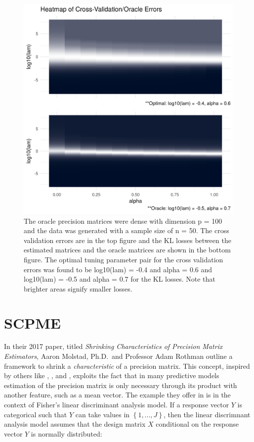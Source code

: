 \documentclass[11pt,]{report}
\theoremstyle{definition}
\theoremstyle{definition}
\theoremstyle{definition}
\theoremstyle{remark}
\begin{document}
\begin{figure}

{\centering \includegraphics[width=0.85\linewidth,]{images/repsKLdenseQR_N50_P100} 

}

\caption{The oracle precision matrices were dense with dimension p = 100 and the data was generated with a sample size of n = 50. The cross validation errors are in the top figure and the KL losses between the estimated matrices and the oracle matrices are shown in the bottom figure. The optimal tuning parameter pair for the cross validation errors was found to be log10(lam) = -0.4 and alpha = 0.6 and log10(lam) = -0.5 and alpha = 0.7 for the KL losses. Note that brighter areas signify smaller losses.}\label{fig:admmsim3}
\end{figure}

\hypertarget{scpme}{%
\chapter{SCPME}\label{scpme}}

In their 2017 paper, titled \emph{Shrinking Characteristics of Precision Matrix Estimators}, Aaron Molstad, Ph.D.~and Professor Adam Rothman outline a framework to shrink a \emph{characteristic} of a precision matrix. This concept, inspired by others like \citet{cai2011direct}, \citet{fan2012road}, and \citet{mai2012direct}, exploits the fact that in many predictive models estimation of the precision matrix is only necessary through its product with another feature, such as a mean vector. The example they offer in \citet{molstad2017shrinking} is in the context of Fisher's linear discriminant analysis model. If a response vector \(Y\) is categorical such that \(Y\) can take values in \(\left\{1, ..., J\right\}\), then the linear discrimnant analysis model assumes that the design matrix \(X\) conditional on the response vector \(Y\) is normally distributed:
\end{document}
